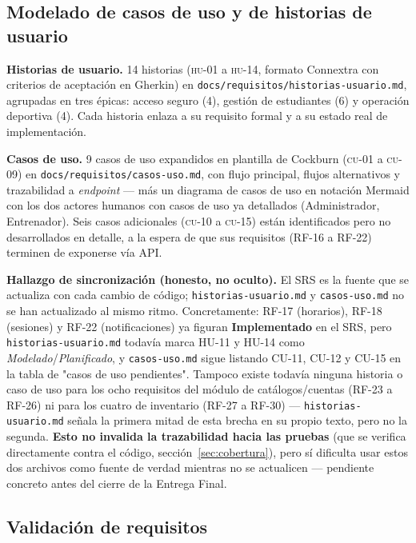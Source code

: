 \documentclass[11pt,a4paper]{article}
\newcommand{\ruta}[1]{\texttt{\footnotesize #1}}
\begin{document}
\subsection{Modelado de casos de uso y de historias de usuario}

\textbf{Historias de usuario.} 14 historias (\textsc{hu}-01 a
\textsc{hu}-14, formato Connextra con criterios de aceptación en Gherkin)
en \ruta{docs/requisitos/historias-usuario.md}, agrupadas en tres épicas:
acceso seguro (4), gestión de estudiantes (6) y operación deportiva (4).
Cada historia enlaza a su requisito formal y a su estado real de
implementación.

\textbf{Casos de uso.} 9 casos de uso expandidos en plantilla de
Cockburn (\textsc{cu}-01 a \textsc{cu}-09) en
\ruta{docs/requisitos/casos-uso.md}, con flujo principal, flujos
alternativos y trazabilidad a \emph{endpoint} — más un diagrama de casos
de uso en notación Mermaid con los dos actores humanos con casos de uso
ya detallados (Administrador, Entrenador). Seis casos adicionales
(\textsc{cu}-10 a \textsc{cu}-15) están identificados pero no
desarrollados en detalle, a la espera de que sus requisitos (RF-16 a
RF-22) terminen de exponerse vía API.

\textbf{Hallazgo de sincronización (honesto, no oculto).} El SRS es la
fuente que se actualiza con cada cambio de código; \ruta{historias-usuario.md}
y \ruta{casos-uso.md} no se han actualizado al mismo ritmo. Concretamente:
RF-17 (horarios), RF-18 (sesiones) y RF-22 (notificaciones) ya figuran
\textcolor{okverde}{\textbf{Implementado}} en el SRS, pero \ruta{historias-usuario.md}
todavía marca HU-11 y HU-14 como \emph{Modelado}/\emph{Planificado}, y \ruta{casos-uso.md} sigue
listando CU-11, CU-12 y CU-15 en la tabla de "casos de uso pendientes".
Tampoco existe todavía ninguna historia o caso de uso para los ocho
requisitos del módulo de catálogos/cuentas (RF-23 a RF-26) ni para los
cuatro de inventario (RF-27 a RF-30) — \ruta{historias-usuario.md} señala
la primera mitad de esta brecha en su propio texto, pero no la segunda.
\textbf{Esto no invalida la trazabilidad hacia las pruebas} (que se
verifica directamente contra el código, sección~\ref{sec:cobertura}), pero
sí dificulta usar estos dos archivos como fuente de verdad mientras no se
actualicen — pendiente concreto antes del cierre de la Entrega Final.

\subsection{Validación de requisitos}
\end{document}
